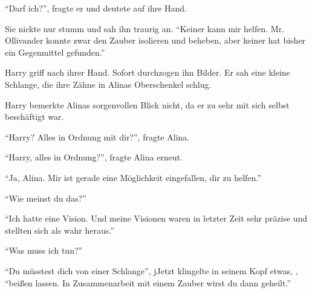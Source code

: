 \enquote{Darf ich?}, fragte er und deutete auf ihre Hand.

Sie nickte nur stumm und sah ihn traurig an. \enquote{Keiner kann mir helfen. Mr. Ollivander konnte zwar den Zauber isolieren und beheben, aber keiner hat bisher ein Gegenmittel gefunden.}

Harry griff nach ihrer Hand. Sofort durchzogen ihn Bilder. Er sah eine kleine Schlange, die ihre Zähne in Alinas Oberschenkel schlug.



Harry bemerkte Alinas sorgenvollen Blick nicht, da er zu sehr mit sich selbst beschäftigt war.


\enquote{Harry? Alles in Ordnung mit dir?}, fragte Alina.







\enquote{Harry, alles in Ordnung?}, fragte Alina erneut.

\enquote{Ja, Alina. Mir ist gerade eine Möglichkeit eingefallen, dir zu helfen.}

\enquote{Wie meinst du das?}

\enquote{Ich hatte eine Vision. Und meine Visionen waren in letzter Zeit sehr präzise und stellten sich als wahr heraus.}

\enquote{Was muss ich tun?}

\enquote{Du müsstest dich von einer Schlange}, jJetzt klingelte in seinem Kopf etwas, , \enquote{beißen lassen. In Zusammenarbeit mit einem Zauber wirst du dann geheilt.}

